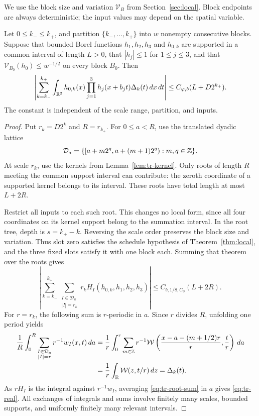 We use the block size and variation \(\mathcal V_B\) from
Section~\ref{sec:local}.  Block endpoints are always deterministic;
the input values may depend on the spatial variable.

\begin{lemma}
\label{lem:tr-real}
Let \(0\leq k_-\leq k_+\), and partition
\(\{k_-,\ldots,k_+\}\) into \(w\) nonempty consecutive blocks.
Suppose that bounded Borel functions \(h_1,h_2,h_3\) and
\(h_{0,k}\) are supported in a common interval of length \(L>0\),
that \(|h_j|\leq1\) for \(1\leq j\leq3\), and that
\(\mathcal V_{B_0}(h_0)\leq w^{-1/2}\) on every block \(B_0\).
Then
\begin{equation}
 \left|\sum_{k=k_-}^{k_+}\int_{\mathbb R^2}
 h_{0,k}(x)\prod_{j=1}^3h_j(x+b_jt)\Delta_k(t)\,dx\,dt\right|
 \leq C_{\varphi,b}(L+D2^{k_+}).
 \label{eq:tr-real}
\end{equation}
The constant is independent of the scale range, partition, and inputs.
\end{lemma}

\begin{proof}
Put \(r_k=D2^k\) and \(R=r_{k_+}\).  For \(0\leq a<R\), use
the translated dyadic lattice
\[
 \mathcal D_a
 =\{[a+m2^q,a+(m+1)2^q):m,q\in\mathbb Z\}.
\]
At scale \(r_k\), use the kernels from Lemma~\ref{lem:tr-kernel}.
Only roots of length \(R\) meeting the common support interval can
contribute: the zeroth coordinate of a supported kernel belongs to
its interval.  These roots have total length at most \(L+2R\).

Restrict all inputs to each such root.  This changes no local form,
since all four coordinates on its kernel support belong to the
summation interval.  In the root tree, depth is \(s=k_+-k\).
Reversing the scale order preserves the block size and variation.
Thus slot zero satisfies the schedule hypothesis of
Theorem~\ref{thm:local}, and the three fixed slots satisfy it with
one block each.  Summing that theorem over the roots gives
\begin{equation}
 \left|\sum_{k=k_-}^{k_+}
    \sum_{\substack{I\in\mathcal D_a\\|I|=r_k}}
    r_k H_I(h_{0,k},h_1,h_2,h_3)\right|
 \leq C_{b,1/8,C_0}(L+2R).
 \label{eq:tr-root-sum}
\end{equation}
For \(r=r_k\), the following sum is \(r\)-periodic in \(a\).
Since \(r\) divides \(R\), unfolding one period yields
\begin{align*}
 \frac1R\int_0^R
  \sum_{\substack{I\in\mathcal D_a\\|I|=r}}r^{-1}w_I(x,t)\,da
 &=\frac1r\int_0^r\sum_{m\in\mathbb Z}r^{-1}
   \mathcal W\left(\frac{x-a-(m+1/2)r}{r},\frac tr\right)\,da\\
 &=\frac1r\int_\mathbb R\mathcal W(z,t/r)\,dz
 =\Delta_k(t).
\end{align*}
As \(rH_I\) is the integral against \(r^{-1}w_I\), averaging
\eqref{eq:tr-root-sum} in \(a\) gives \eqref{eq:tr-real}.
All exchanges of integrals and sums involve finitely many scales,
bounded supports, and uniformly finitely many relevant intervals.
\end{proof}

